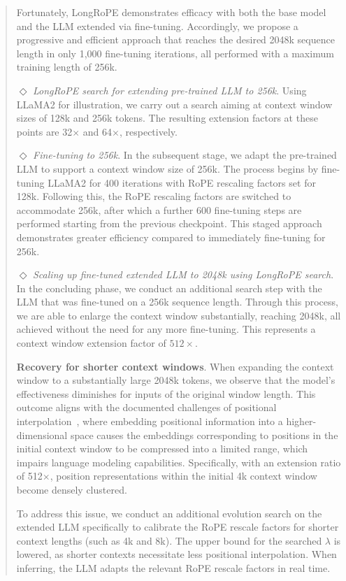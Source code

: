 \begin{abstract}
Fortunately, LongRoPE demonstrates efficacy with both the base model and the LLM extended via fine-tuning. Accordingly, we propose a progressive and efficient approach that reaches the desired 2048k sequence length in only 1,000 fine-tuning iterations, all performed with a maximum training length of 256k.

$\Diamond$ \textit{LongRoPE search for extending pre-trained LLM to 256k}. Using LLaMA2 for illustration, we carry out a search aiming at context window sizes of 128k and 256k tokens. The resulting extension factors at these points are 32$\times$ and 64$\times$, respectively.

$\Diamond$ \textit{Fine-tuning to 256k}. In the subsequent stage, we adapt the pre-trained LLM to support a context window size of 256k. The process begins by fine-tuning LLaMA2 for 400 iterations with RoPE rescaling factors set for 128k. Following this, the RoPE rescaling factors are switched to accommodate 256k, after which a further 600 fine-tuning steps are performed starting from the previous checkpoint. This staged approach demonstrates greater efficiency compared to immediately fine-tuning for 256k.

$\Diamond$ \textit{Scaling up fine-tuned extended LLM to 2048k using LongRoPE search}. In the concluding phase, we conduct an additional search step with the LLM that was fine-tuned on a 256k sequence length. Through this process, we are able to enlarge the context window substantially, reaching 2048k, all achieved without the need for any more fine-tuning. This represents a context window extension factor of $512\times$.

\textbf{Recovery for shorter context windows}. When expanding the context window to a substantially large 2048k tokens, we observe that the model's effectiveness diminishes for inputs of the original window length. This outcome aligns with the documented challenges of positional interpolation~\cite{pi}, where embedding positional information into a higher-dimensional space causes the embeddings corresponding to positions in the initial context window to be compressed into a limited range, which impairs language modeling capabilities. Specifically, with an extension ratio of 512$\times$, position representations within the initial 4k context window become densely clustered.

To address this issue, we conduct an additional evolution search on the extended LLM specifically to calibrate the RoPE rescale factors for shorter context lengths (such as 4k and 8k). The upper bound for the searched $\lambda$ is lowered, as shorter contexts necessitate less positional interpolation. When inferring, the LLM adapts the relevant RoPE rescale factors in real time.


\end{abstract}
